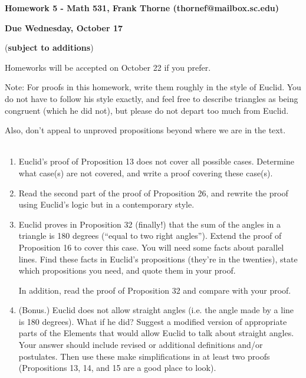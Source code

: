 \documentclass[12pt]{article}
\begin{document}
\setlength{\topmargin}{-2mm}





\begin{center}{\bf Homework 5 - Math 531, Frank Thorne (thornef@mailbox.sc.edu)}
\end{center}
\begin{center}
{\bf Due Wednesday, October 17}
\end{center}
({\bf subject to additions})

Homeworks will be accepted on October 22 if you prefer.

Note: For proofs in this homework, write them roughly in the style of Euclid.
You do not have to follow his style exactly, and feel free to describe triangles as being
congruent (which he did not), but please do not depart too much from Euclid.

Also, don't appeal to unproved propositions beyond where we are in the text.
\\
\\
\begin{enumerate}[(1)]
\item
Euclid's proof of Proposition 13 does not cover all possible cases. Determine what case(s) are not covered,
and write a proof covering these case(s).

\item
Read the second part of the proof of Proposition 26, and rewrite the proof using Euclid's logic but in a contemporary style.

\item
Euclid proves in Proposition 32 (finally!) that the sum of the angles in a triangle is 180 degrees (``equal to two right angles'').
Extend the proof of Proposition 16 to cover this case. You will need some facts about parallel lines. Find these
facts in Euclid's propositions (they're in the twenties), state which propositions you need, and quote them in your proof.

In addition, read the proof of Proposition 32 and compare with your proof.

\item (Bonus.)
Euclid does not allow straight angles (i.e. the angle made by a line is 180 degrees).
What if he did? Suggest a modified version of appropriate parts of the Elements
that would allow Euclid to talk about straight angles. Your answer should include revised or additional
definitions and/or postulates. Then use these make simplifications in at least two proofs (Propositions 13, 14, and 15 
are a good place to look).

\end{enumerate}
\end{document}
